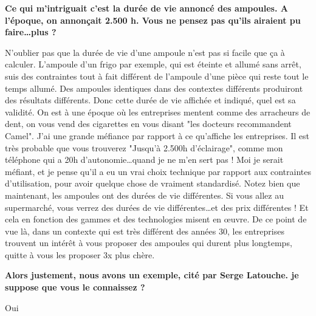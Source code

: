 \begin{small}


\textbf{Ce qui m'intriguait c'est la  durée de vie annoncé des ampoules. A l'époque, on annonçait 2.500 h. Vous ne pensez pas qu'ils airaient pu faire\dots plus ?
}\smallbreak

N'oublier pas que la durée de vie d'une ampoule n'est pas si facile que ça à calculer. L'ampoule d'un frigo par exemple, qui est éteinte et allumé sans arrêt, suis des contraintes tout à fait différent de l'ampoule d'une pièce qui reste tout le temps allumé.
Des ampoules identiques dans des contextes différents produiront des résultats différents. Donc cette durée de vie affichée et indiqué, quel est sa validité. On est à une époque où les entreprises mentent comme des arracheurs de dent, on vous vend des cigarettes en vous disant "les docteurs recommandent Camel". J'ai une grande méfiance par rapport à ce qu'affiche les entreprises. Il est très probable que vous trouverez "Jusqu'à 2.500h d'éclairage", comme mon téléphone qui a 20h d'autonomie\dots quand je ne m'en sert pas !
Moi je serait méfiant, et je pense qu'il a eu un vrai choix technique par rapport aux contraintes d'utilisation, pour avoir quelque chose de vraiment standardisé.
Notez bien que maintenant, les ampoules ont des durées de vie différentes. Si vous allez au supermarché, vous verrez des durées de vie différentes\dots et des prix différentes ! Et cela en fonction des gammes et des technologies misent en œuvre.
De ce point de vue là, dans un contexte qui est très différent des années 30, les entreprises trouvent un intérêt à vous proposer des ampoules qui durent plus longtemps, quitte à vous les proposer 3x plus chère.

\textbf{Alors justement, nous avons un exemple, cité par Serge Latouche. je suppose que vous le connaissez ?}
\smallbreak


Oui


\end{small}
